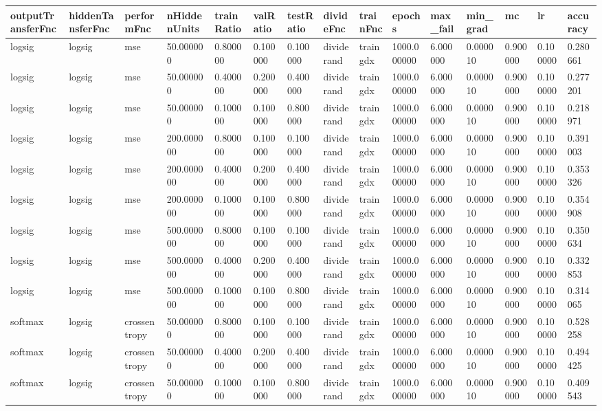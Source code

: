 \begin{tabular}{lllllllllllllll}
outputTransferFnc & hiddenTansferFnc & performFnc & nHiddenUnits & trainRatio & valRatio & testRatio & divideFnc & trainFnc & epochs & max_fail & min_grad & mc & lr & accuracy \\ 
\hline 
logsig & logsig & mse & 50.000000 & 0.800000 & 0.100000 & 0.100000 & dividerand & traingdx & 1000.000000 & 6.000000 & 0.000010 & 0.900000 & 0.100000 & 0.280661 \\ 
logsig & logsig & mse & 50.000000 & 0.400000 & 0.200000 & 0.400000 & dividerand & traingdx & 1000.000000 & 6.000000 & 0.000010 & 0.900000 & 0.100000 & 0.277201 \\ 
logsig & logsig & mse & 50.000000 & 0.100000 & 0.100000 & 0.800000 & dividerand & traingdx & 1000.000000 & 6.000000 & 0.000010 & 0.900000 & 0.100000 & 0.218971 \\ 
logsig & logsig & mse & 200.000000 & 0.800000 & 0.100000 & 0.100000 & dividerand & traingdx & 1000.000000 & 6.000000 & 0.000010 & 0.900000 & 0.100000 & 0.391003 \\ 
logsig & logsig & mse & 200.000000 & 0.400000 & 0.200000 & 0.400000 & dividerand & traingdx & 1000.000000 & 6.000000 & 0.000010 & 0.900000 & 0.100000 & 0.353326 \\ 
logsig & logsig & mse & 200.000000 & 0.100000 & 0.100000 & 0.800000 & dividerand & traingdx & 1000.000000 & 6.000000 & 0.000010 & 0.900000 & 0.100000 & 0.354908 \\ 
logsig & logsig & mse & 500.000000 & 0.800000 & 0.100000 & 0.100000 & dividerand & traingdx & 1000.000000 & 6.000000 & 0.000010 & 0.900000 & 0.100000 & 0.350634 \\ 
logsig & logsig & mse & 500.000000 & 0.400000 & 0.200000 & 0.400000 & dividerand & traingdx & 1000.000000 & 6.000000 & 0.000010 & 0.900000 & 0.100000 & 0.332853 \\ 
logsig & logsig & mse & 500.000000 & 0.100000 & 0.100000 & 0.800000 & dividerand & traingdx & 1000.000000 & 6.000000 & 0.000010 & 0.900000 & 0.100000 & 0.314065 \\ 
softmax & logsig & crossentropy & 50.000000 & 0.800000 & 0.100000 & 0.100000 & dividerand & traingdx & 1000.000000 & 6.000000 & 0.000010 & 0.900000 & 0.100000 & 0.528258 \\ 
softmax & logsig & crossentropy & 50.000000 & 0.400000 & 0.200000 & 0.400000 & dividerand & traingdx & 1000.000000 & 6.000000 & 0.000010 & 0.900000 & 0.100000 & 0.494425 \\ 
softmax & logsig & crossentropy & 50.000000 & 0.100000 & 0.100000 & 0.800000 & dividerand & traingdx & 1000.000000 & 6.000000 & 0.000010 & 0.900000 & 0.100000 & 0.409543 \\ 

\end{tabular}
